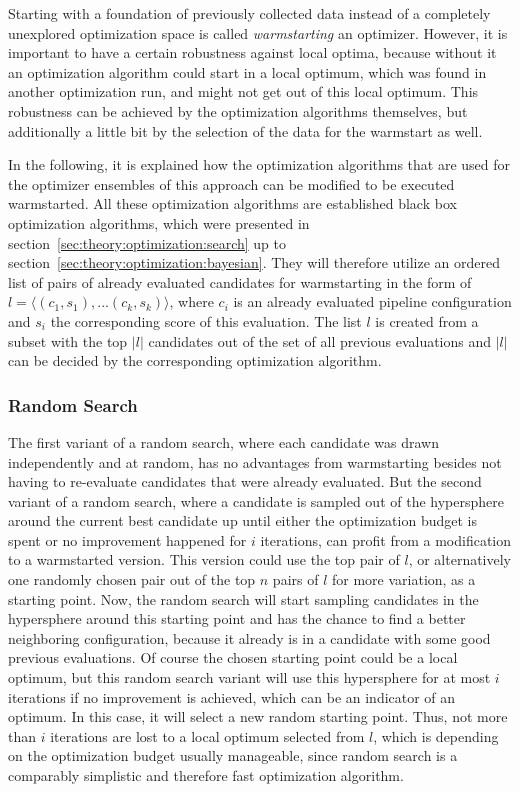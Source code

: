 Starting with a foundation of previously collected data instead of a completely unexplored optimization space is called \textit{warmstarting} an optimizer.
However, it is important to have a certain robustness against local optima, because without it an optimization algorithm could start in a local optimum, which was found in another optimization run, and might not get out of this local optimum.
This robustness can be achieved by the optimization algorithms themselves, but additionally a little bit by the selection of the data for the warmstart as well.

In the following, it is explained how the optimization algorithms that are used for the optimizer ensembles of this approach can be modified to be executed warmstarted.
All these optimization algorithms are established black box optimization algorithms, which were presented in section~\ref{sec:theory:optimization:search} up to section~\ref{sec:theory:optimization:bayesian}.
They will therefore utilize an ordered list of pairs of already evaluated candidates for warmstarting in the form of $l = \langle (c_1, s_1), ... (c_k, s_k) \rangle$, where $c_i$ is an already evaluated pipeline configuration and $s_i$ the corresponding score of this evaluation.
The list $l$ is created from a subset with the top $|l|$ candidates out of the set of all previous evaluations and $|l|$ can be decided by the corresponding optimization algorithm.

\subsubsection{Random Search}
The first variant of a random search, where each candidate was drawn independently and at random, has no advantages from warmstarting besides not having to re-evaluate candidates that were already evaluated.\newline
But the second variant of a random search, where a candidate is sampled out of the hypersphere around the current best candidate up until either the optimization budget is spent or no improvement happened for $i$ iterations, can profit from a modification to a warmstarted version.
This version could use the top pair of $l$, or alternatively one randomly chosen pair  out of the top $n$ pairs of $l$ for more variation, as a starting point.\newline
Now, the random search will start sampling candidates in the hypersphere around this starting point and has the chance to find a better neighboring configuration, because it already is in a candidate with some good previous evaluations.\newline
Of course the chosen starting point could be a local optimum, but this random search variant will use this hypersphere for at most $i$ iterations if no improvement is achieved, which can be an indicator of an optimum.
In this case, it will select a new random starting point.
Thus, not more than $i$ iterations are lost to a local optimum selected from $l$, which is depending on the optimization budget usually manageable, since random search is a comparably simplistic and therefore fast optimization algorithm.

